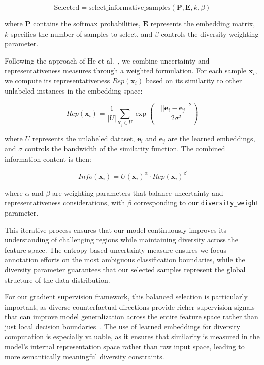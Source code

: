 \documentclass[sigconf,anonymous]{aamas}
\begin{document}
\begin{equation}
\text{Selected} = \text{select\_informative\_samples}(\mathbf{P}, \mathbf{E}, k, \beta)
\end{equation}

where $\mathbf{P}$ contains the softmax probabilities, $\mathbf{E}$ represents the embedding matrix, $k$ specifies the number of samples to select, and $\beta$ controls the diversity weighting parameter.

Following the approach of He et al.~\cite{he2014active}, we combine uncertainty and representativeness measures through a weighted formulation. For each sample $\mathbf{x}_i$, we compute its representativeness $Rep(\mathbf{x}_i)$ based on its similarity to other unlabeled instances in the embedding space:

\begin{equation}
Rep(\mathbf{x}_i) = \frac{1}{|U|} \sum_{\mathbf{x}_j \in U} \exp\left(-\frac{||\mathbf{e}_i - \mathbf{e}_j||^2}{2\sigma^2}\right)
\end{equation}

where $U$ represents the unlabeled dataset, $\mathbf{e}_i$ and $\mathbf{e}_j$ are the learned embeddings, and $\sigma$ controls the bandwidth of the similarity function. The combined information content is then:

\begin{equation}
Info(\mathbf{x}_i) = U(\mathbf{x}_i)^\alpha \cdot Rep(\mathbf{x}_i)^\beta
\end{equation}

where $\alpha$ and $\beta$ are weighting parameters that balance uncertainty and representativeness considerations, with $\beta$ corresponding to our \texttt{diversity\_weight} parameter.

This iterative process ensures that our model continuously improves its understanding of challenging regions while maintaining diversity across the feature space. The entropy-based uncertainty measure ensures we focus annotation efforts on the most ambiguous classification boundaries, while the diversity parameter guarantees that our selected samples represent the global structure of the data distribution.

For our gradient supervision framework, this balanced selection is particularly important, as diverse counterfactual directions provide richer supervision signals that can improve model generalization across the entire feature space rather than just local decision boundaries~\cite{kaushik2019learning}. The use of learned embeddings for diversity computation is especially valuable, as it ensures that similarity is measured in the model's internal representation space rather than raw input space, leading to more semantically meaningful diversity constraints.
\end{document}
